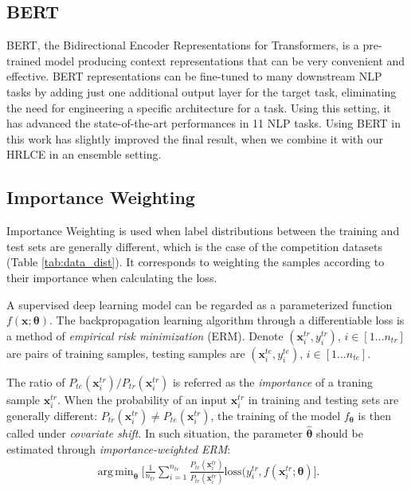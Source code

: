 \documentclass[11pt,a4paper]{article}
\DeclareMathOperator*{\argminA}{arg\,min}
\begin{document}
\subsection{BERT}
\label{sec:BERT}
BERT, the Bidirectional Encoder Representations for Transformers, \cite{devlin2018bert} is a pre-trained model producing context representations that can be very convenient and effective. BERT representations can be fine-tuned to many downstream NLP tasks by adding just one additional output layer for the target task, eliminating the need for engineering a specific architecture for a task. Using this setting, it has advanced the state-of-the-art performances in 11 NLP tasks. 
Using BERT in this work has slightly improved the final result, when we combine it with our HRLCE in an ensemble setting.




\subsection{Importance Weighting}
Importance Weighting \cite{sugiyama2012machine} is used when label distributions between the training and test sets are generally different, which is the case of the competition datasets (Table \ref{tab:data_dist}).
It corresponds to weighting the samples according to their importance when calculating the loss.  


A supervised deep learning model can be regarded as a parameterized function $f(\bm{x};\bm{\theta})$. The backpropagation learning algorithm through a differentiable loss is a method of \emph{empirical risk minimization} (ERM). Denote $(\bm{x}_i^{tr}, y_i^{tr})$, $i \in [1 \dots n_{tr}]$ are pairs of training samples, testing samples are $(\bm{x}_i^{te}, y_i^{te})$, $i \in [1 \dots n_{te}]$.

The ratio of $P_{te}(\bm{x}_i^{tr}) / P_{tr}(\bm{x}_i^{tr})$ is referred as the \emph{importance} of a traning sample $\bm{x}_i^{tr}$.
When the probability of an input $\bm{x}_i^{tr}$ in training and testing sets are generally different: $P_{tr}(\bm{x}_i^{tr}) \ne P_{te}(\bm{x}_i^{tr})$, the training of the model $f_{\bm{\theta}}$ is then called under \emph{covariate shift}. In such situation, the parameter $\hat{\bm{\theta}}$ should be estimated through \emph{importance-weighted ERM}:\begin{align}
\label{eq:erm}
    \argminA_{\bm{\theta}} \Big[ \frac{1}{n_{tr}} \sum_{i=1}^{n_{tr}} \frac{P_{te}(\bm{x}_i^{tr})}{P_{tr}(\bm{x}_i^{tr})}\text{loss} (y_i^{tr}, f(\bm{x}_i^{tr}; \bm{\theta} ) \Big].
\end{align}
\end{document}
